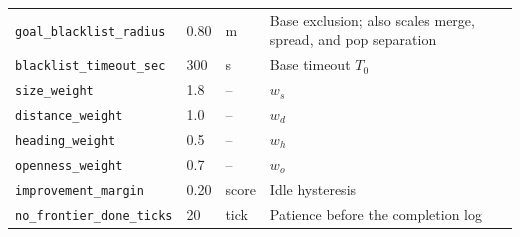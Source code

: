\documentclass[11pt]{article}
\begin{document}
\begin{longtable}{@{}p{4.0cm}p{2.3cm}p{1.2cm}p{6.3cm}@{}}
\texttt{goal\_blacklist\_radius} & 0.80 & m & Base exclusion; also scales merge, spread, and pop separation \\
\texttt{blacklist\_timeout\_sec} & 300 & s & Base timeout $T_0$ \\
\texttt{size\_weight} & 1.8 & -- & $w_s$ \\
\texttt{distance\_weight} & 1.0 & -- & $w_d$ \\
\texttt{heading\_weight} & 0.5 & -- & $w_h$ \\
\texttt{openness\_weight} & 0.7 & -- & $w_o$ \\
\texttt{improvement\_margin} & 0.20 & score & Idle hysteresis \\
\texttt{no\_frontier\_done\_ticks} & 20 & tick & Patience before the completion log \\
\bottomrule
\end{longtable}
\end{document}
